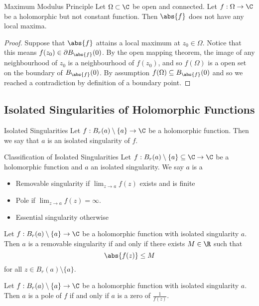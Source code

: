 \documentclass[a4paper]{article}
\begin{document}
\begin{crl}{Maximum Modulus Principle}{} Let $\Omega\subset\C$ be open and connected. Let $f:\Omega\to\C$ be a holomorphic but not constant function. Then $\abs{f}$ does not have any local maxima. \tcbline
\begin{proof}
Suppose that $\abs{f}$ attains a local maximum at $z_0\in\Omega$. Notice that this means $f(z_0)\in\partial B_{\abs{f}}(0)$. By the open mapping theorem, the image of any neighbourhood of $z_0$ is a neighbourhood of $f(z_0)$, and so $f(\Omega)$ is a open set on the boundary of $B_{\abs{f}}(0)$. By assumption $f(\Omega)\subseteq B_{\abs{f}}(0)$ and so we reached a contradiction by definition of a boundary point. 
\end{proof}
\end{crl}

\subsection{Isolated Singularities of Holomorphic Functions}
\begin{defn}{Isolated Singularities}{} Let $f:B_r(a)\setminus\{a\}\to\C$ be a holomorphic function. Then we say that $a$ is an isolated singularity of $f$. 
\end{defn}

\begin{defn}{Classification of Isolated Singularities}{} Let $f:B_r(a)\setminus\{a\}\subseteq\C\to\C$ be a holomorphic function and $a$ an isolated singularity. We say $a$ is a
\begin{itemize}
\item Removable singularity if $\lim_{z\to a}f(z)$ exists and is finite
\item Pole if $\lim_{z\to a}f(z)=\infty$. 
\item Essential singularity otherwise
\end{itemize}
\end{defn}

\begin{lmm}{}{} Let $f:B_r(a)\setminus\{a\}\to\C$ be a holomorphic function with isolated singularity $a$. Then $a$ is a removable singularity if and only if there exists $M\in\R$ such that $$\abs{f(z)}\leq M$$ for all $z\in B_r(a)\setminus\{a\}$. 
\end{lmm}

\begin{lmm}{}{} Let $f:B_r(a)\setminus\{a\}\to\C$ be a holomorphic function with isolated singularity $a$. Then $a$ is a pole of $f$ if and only if $a$ is a zero of $\frac{1}{f(z)}$. 
\end{lmm}
\end{document}
